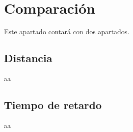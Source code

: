 

\newpage
\section{Comparación}

Este apartado contará con dos apartados.

\subsection*{Distancia}

aa

\subsection*{Tiempo de retardo}

aa




